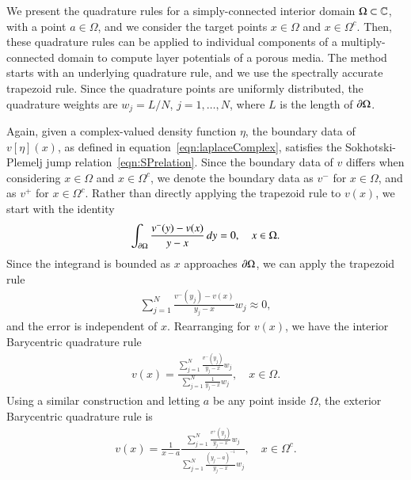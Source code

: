 \documentclass[preprint,10pt]{elsarticle}
\begin{document}
We present the quadrature rules for a simply-connected interior domain
$\Omega \subset {\mathbb{C}}$, with a point $a \in \Omega$, and we consider the
target points $x \in \Omega$ and $x \in \Omega^c$. Then, these
quadrature rules can be applied to individual components of a
multiply-connected domain to compute layer potentials of a porous media.
The method starts with an underlying quadrature rule, and we use the
spectrally accurate trapezoid rule.  Since the quadrature points are
uniformly distributed, the quadrature weights are $w_j = L/N$,
$j=1,\ldots,N$, where $L$ is the length of ${\partial}\Omega$.

Again, given a complex-valued density function $\eta$, the boundary data
of $v[\eta](x)$, as defined in equation~\eqref{eqn:laplaceComplex},
satisfies the Sokhotski-Plemelj jump relation~\eqref{eqn:SPrelation}.
Since the boundary data of $v$ differs when considering $x \in \Omega$
and $x \in \Omega^c$, we denote the boundary data as $v^-$ for $x \in
\Omega$, and as $v^+$ for $x \in \Omega^c$.  Rather than directly
applying the trapezoid rule to $v(x)$, we start with the identity
\begin{align}
  \int_{{\partial}\Omega} \frac{v^{-}(y) - v(x)}{y - x} \,dy = 0,
    \quad x \in \Omega.
\end{align}
Since the integrand is bounded as $x$ approaches ${\partial}\Omega$, we can
apply the trapezoid rule
\begin{align}
  \sum_{j=1}^{N} \frac{v^{-}(y_j) - v(x)}{y_j - x} w_j \approx 0,
\end{align}
and the error is independent of $x$.  Rearranging for $v(x)$, we have
the interior Barycentric quadrature rule
\begin{align}
  v(x) = \frac{\sum\limits_{j=1}^N \frac{v^{-}(y_j)}{y_j - x} w_j}
  {\sum\limits_{j=1}^N \frac{1}{y_j - x} w_j}, \quad x \in \Omega.
  \label{eqn:BaryvInterior}
\end{align}
Using a similar construction and letting $a$ be any point inside
$\Omega$, the exterior Barycentric quadrature rule is
\begin{align}
  v(x) = \frac{1}{x-a} 
    \frac{\sum\limits_{j=1}^N \frac{v^+(y_j)}{y_j - x}w_j}
    {\sum\limits_{j=1}^N \frac{(y_j - a)^{-1}}{y_j - x}w_j},
    \quad x \in \Omega^c.
  \label{eqn:BaryvExterior}
\end{align}
\end{document}
